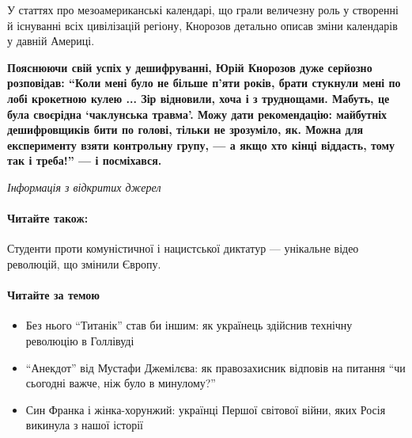 У статтях про мезоамериканські календарі, що грали величезну роль у
створенні й існуванні всіх цивілізацій регіону, Кнорозов детально описав
зміни календарів у давній Америці.

\begin{leftbar}
        \bfseries
Пояснюючи свій успіх у дешифруванні, Юрій Кнорозов дуже серйозно
розповідав: \enquote{Коли мені було не більше п'яти років, брати стукнули мені
по лобі крокетною кулею ... Зір відновили, хоча і з труднощами. Мабуть,
це була своєрідна \enquote{чаклунська травма}. Можу дати рекомендацію: майбутніх
дешифровщиків бити по голові, тільки не зрозуміло, як. Можна для
експерименту взяти контрольну групу, --- а якщо хто кінці віддасть, тому
так і треба!} --- і посміхався.
\end{leftbar}

\emph{Інформація з відкритих джерел}

\paragraph{Читайте також:}

Студенти проти комуністичної і нацистської диктатур --- унікальне відео революцій, що змінили Європу.

\paragraph{Читайте за темою}

\begin{itemize}
\item Без нього \enquote{Титанік} став би іншим: як українець здійснив технічну революцію в
Голлівуді

\item \enquote{Анекдот} від Мустафи Джемілєва: як правозахисник відповів на питання \enquote{чи
сьогодні важче, ніж було в минулому?}

\item Син Франка і жінка-хорунжий: українці Першої світової війни, яких Росія
        викинула з нашої історії
\end{itemize}

